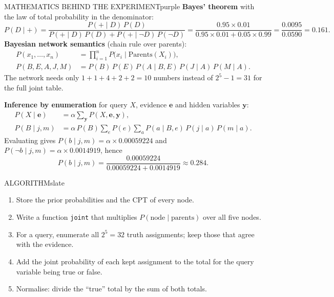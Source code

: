 \documentclass[11pt,a4paper]{article}
\newenvironment{maths}{\begin{secbox}{MATHEMATICS BEHIND THE EXPERIMENT}{purple}}{\end{secbox}}
\newenvironment{algorithm}{\begin{secbox}{ALGORITHM}{slate}}{\end{secbox}}
\begin{document}
\begin{maths}
\textbf{Bayes' theorem} with the law of total probability in the denominator:
\[ P(D\mid +)=\frac{P(+\mid D)\,P(D)}{P(+\mid D)\,P(D)+P(+\mid\lnot D)\,P(\lnot D)}
=\frac{0.95\times0.01}{0.95\times0.01+0.05\times0.99}=\frac{0.0095}{0.0590}=0.161 . \]
\textbf{Bayesian network semantics} (chain rule over parents):
\begin{align*}
P(x_1,\dots,x_n)&=\prod_{i=1}^{n}P\bigl(x_i\mid \mathrm{Parents}(X_i)\bigr),\\
P(B,E,A,J,M)&=P(B)\,P(E)\,P(A\mid B,E)\,P(J\mid A)\,P(M\mid A).
\end{align*}
The network needs only $1+1+4+2+2=10$ numbers instead of $2^{5}-1=31$ for the full joint table.

\textbf{Inference by enumeration} for query $X$, evidence $\mathbf{e}$ and hidden variables $\mathbf{y}$:
\begin{align*}
P(X\mid \mathbf{e})&=\alpha\sum_{\mathbf{y}}P(X,\mathbf{e},\mathbf{y}),\\
P(B\mid j,m)&=\alpha\,P(B)\sum_{e}P(e)\sum_{a}P(a\mid B,e)\,P(j\mid a)\,P(m\mid a).
\end{align*}
Evaluating gives $P(b\mid j,m)=\alpha\times 0.00059224$ and $P(\lnot b\mid j,m)=\alpha\times 0.0014919$, hence
\[ P(b\mid j,m)=\frac{0.00059224}{0.00059224+0.0014919}\approx 0.284 . \]
\end{maths}

\begin{algorithm}
\begin{enumerate}
  \item Store the prior probabilities and the CPT of every node.
  \item Write a function \texttt{joint} that multiplies $P(\text{node}\mid\text{parents})$ over all five nodes.
  \item For a query, enumerate all $2^{5}=32$ truth assignments; keep those that agree with the evidence.
  \item Add the joint probability of each kept assignment to the total for the query variable being true or false.
  \item Normalise: divide the ``true'' total by the sum of both totals.
\end{enumerate}
\end{algorithm}
\end{document}
